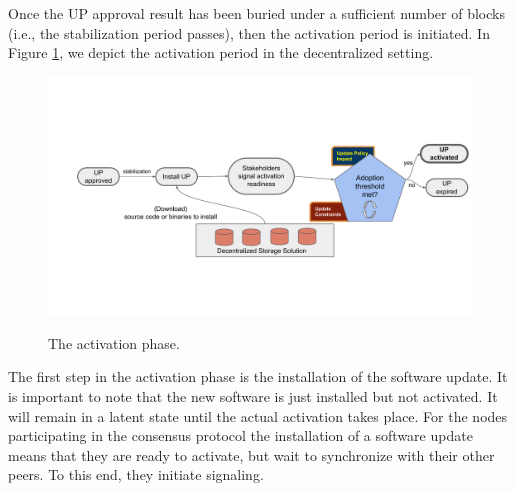 Once the UP approval result has been buried under a sufficient number of blocks (i.e., the stabilization period passes), then the activation period is initiated. In Figure \ref{activation}, we depict the activation period in the decentralized setting.
\begin{figure}[h!] %
    \caption{The activation phase.}
    \centering
    \includegraphics[width=1.0 \columnwidth,keepaspectratio]{figures/activation_phase.pdf}
    \label{activation}
\end{figure}
The first step in the activation phase is the installation of the software update. It is important to note that the new software is just installed but not activated. It will remain in a latent state until the actual activation takes place. For the nodes participating in the consensus protocol the installation of a software update means that they are ready to activate, but wait to synchronize with their other peers. To this end, they initiate signaling. %

